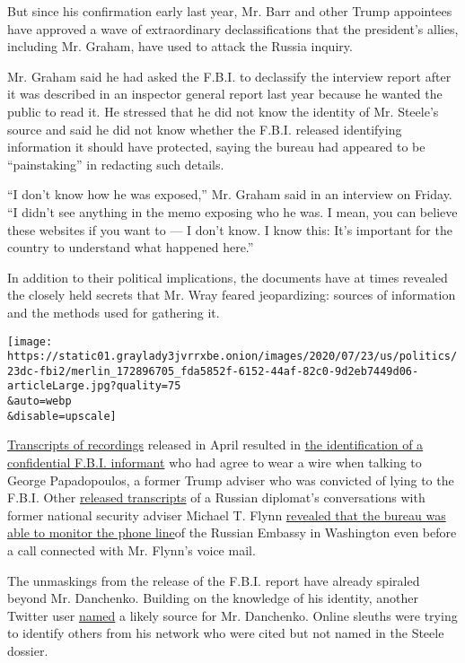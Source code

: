 But since his confirmation early last year, Mr. Barr and other Trump
appointees have approved a wave of extraordinary declassifications that
the president's allies, including Mr. Graham, have used to attack the
Russia inquiry.

Mr. Graham said he had asked the F.B.I. to declassify the interview
report after it was described in an inspector general report last year
because he wanted the public to read it. He stressed that he did not
know the identity of Mr. Steele's source and said he did not know
whether the F.B.I. released identifying information it should have
protected, saying the bureau had appeared to be ``painstaking'' in
redacting such details.

``I don't know how he was exposed,'' Mr. Graham said in an interview on
Friday. ``I didn't see anything in the memo exposing who he was. I mean,
you can believe these websites if you want to --- I don't know. I know
this: It's important for the country to understand what happened here.''

In addition to their political implications, the documents have at times
revealed the closely held secrets that Mr. Wray feared jeopardizing:
sources of information and the methods used for gathering it.

\texttt{[image: https://static01.graylady3jvrrxbe.onion/images/2020/07/23/us/politics/23dc-fbi2/merlin\_172896705\_fda5852f-6152-44af-82c0-9d2eb7449d06-articleLarge.jpg?quality=75\\\&auto=webp\\\&disable=upscale]}

\href{https://www.judiciary.senate.gov/imo/media/doc/2020-04-24\%20Submission\%20SJC\%20SSCI.pdf}{Transcripts
of recordings} released in April resulted in
\href{https://dailycaller.com/2020/05/06/george-papadopoulos-fbi-informant-transcript/}{the
identification of a confidential F.B.I. informant} who had agree to wear
a wire when talking to George Papadopoulos, a former Trump adviser who
was convicted of lying to the F.B.I. Other
\href{https://int.graylady3jvrrxbe.onion/data/documenthelper/6976-flynn-kislyak-transcripts/cd9e96e708a9b0c8ba58/optimized/full.pdf\#page=1}{released
transcripts} of a Russian diplomat's conversations with former national
security adviser Michael T. Flynn
\href{https://www.nytimes3xbfgragh.onion/2020/05/29/us/politics/flynn-russian-ambassador-transcripts.html}{revealed
that the bureau was able to monitor the phone line}of the Russian
Embassy in Washington even before a call connected with Mr. Flynn's
voice mail.

The unmaskings from the release of the F.B.I. report have already
spiraled beyond Mr. Danchenko. Building on the knowledge of his
identity, another Twitter user
\href{https://twitter.com/FOOL_NELSON/status/1285347075048251392}{named}
a likely source for Mr. Danchenko. Online sleuths were trying to
identify others from his network who were cited but not named in the
Steele dossier.

